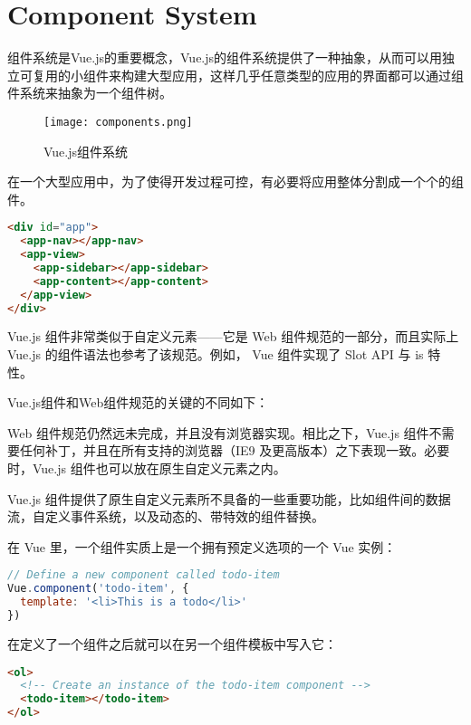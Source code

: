 \section{Component System}


组件系统是Vue.js的重要概念，Vue.js的组件系统提供了一种抽象，从而可以用独立可复用的小组件来构建大型应用，这样几乎任意类型的应用的界面都可以通过组件系统来抽象为一个组件树。


\begin{figure}[htbp]
\centering
\texttt{[image: components.png]}
\caption{Vue.js组件系统}
\end{figure}

在一个大型应用中，为了使得开发过程可控，有必要将应用整体分割成一个个的组件。

\begin{lstlisting}[language=HTML]
<div id="app">
  <app-nav></app-nav>
  <app-view>
    <app-sidebar></app-sidebar>
    <app-content></app-content>
  </app-view>
</div>
\end{lstlisting}


Vue.js 组件非常类似于自定义元素——它是 Web 组件规范的一部分，而且实际上 Vue.js 的组件语法也参考了该规范。例如， Vue 组件实现了 Slot API 与 is 特性。

Vue.js组件和Web组件规范的关键的不同如下：

\begin{compactenum}
\item Web 组件规范仍然远未完成，并且没有浏览器实现。相比之下，Vue.js 组件不需要任何补丁，并且在所有支持的浏览器（IE9 及更高版本）之下表现一致。必要时，Vue.js 组件也可以放在原生自定义元素之内。
\item Vue.js 组件提供了原生自定义元素所不具备的一些重要功能，比如组件间的数据流，自定义事件系统，以及动态的、带特效的组件替换。
\end{compactenum}

在 Vue 里，一个组件实质上是一个拥有预定义选项的一个 Vue 实例：


\begin{lstlisting}[language=JavaScript]
// Define a new component called todo-item
Vue.component('todo-item', {
  template: '<li>This is a todo</li>'
})
\end{lstlisting}

在定义了一个组件之后就可以在另一个组件模板中写入它：

\begin{lstlisting}[language=HTML]
<ol>
  <!-- Create an instance of the todo-item component -->
  <todo-item></todo-item>
</ol>
\end{lstlisting}

